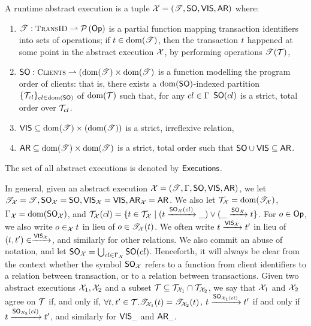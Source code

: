 \begin{definition}
A runtime abstract execution is a tuple $\mathcal{X} = (\mathscr{T}, {\sf{SO}}, {\mathsf{VIS}}, {\sf{AR}})$ where: 
\begin{enumerate}
\item $\TtoOp{T} : \TransID \rightharpoonup \powerset{\Op}$ is a partial function mapping transaction 
identifiers into sets of operations; if $t \in \operatorname{dom}(\mathscr{T})$, then the transaction $t$ happened 
at some point in the abstract execution ${\mathcal{X}}$, by performing operations $\mathscr{T}(\mathcal{T})$, 
\item $\PO: \tidset \rightharpoonup (\dom(\TtoOp{T}) \times \dom(\TtoOp{T})$ is a function modelling the 
program order of clients: that is, there exists a $\operatorname{dom}({\sf{SO}})$-indexed partition $\{\mathcal{T}_{cl}\}_{cl \in \operatorname{dom}({\sf{SO}})}$ of 
$\operatorname{dom}(\mathscr{\mathcal{T}})$ such that, for any $cl \in \Gamma$ ${\sf{SO}}(cl)$ is a strict, total order over $\mathcal{T}_{cl}$.
\item ${\mathsf{VIS}} \subseteq \operatorname{dom}(\mathscr{T}) \times (\operatorname{dom}(\mathscr{T}))$ is a strict, irreflexive relation, 
\item ${\sf{AR}} \subseteq \operatorname{dom}(\mathscr{T}) \times \operatorname{dom}(\mathscr{T})$ is a strict, total order such that ${\sf{SO}} \cup {\mathsf{VIS}} \subseteq {\sf{AR}}$.
\end{enumerate}

The set of all abstract executions is denoted by ${\mathsf{Executions}}$.
\end{definition}
In general, given an abstract execution ${\mathcal{X}} = (\mathscr{T}, \Gamma, {\sf{SO}}, {\mathsf{VIS}}, {\sf{AR}})$, we let ${\mathscr{T}}_{\mathcal{X}} = \mathscr{T}, 
 {\sf{SO}}_{\mathcal{X}} = {\sf{SO}}, {{\mathsf{VIS}}}_{\mathcal{X}} = {\mathsf{VIS}}, {\sf{AR}}_{\mathcal{X}} = {\sf{AR}}$. We also let $\mathcal{T}_{\mathcal{X}} = \operatorname{dom}(\mathscr{T}_{\mathcal{X}})$, 
 $\Gamma_{\mathcal{X}} = \operatorname{dom}({\sf{SO}}_{\mathcal{X}})$, and $\mathcal{T}_{\mathcal{X}}(cl) = \{t \in \mathcal{T}_{\mathcal{X}} \mid (t \xrightarrow{{\sf{SO}}_{\mathcal{X}}(cl)} \_) 
 \vee (\_ \xrightarrow{{\sf{SO}}_{\mathcal{X}}} t \}$. For $o \in \mathsf{Op}$, we also write $o \in_{{\mathcal{X}}} t$ in lieu of $o \in \mathscr{T}_{\mathcal{X}}(t)$.
We often write $t \xrightarrow{{\mathsf{VIS}}_{{\mathcal{X}}}} t'$ in lieu of $(t, t') \in \xrightarrow{{\mathsf{VIS}}_{{\mathcal{X}}}}$, 
and similarly for other relations. We also commit an abuse of notation, and let ${\sf{SO}}_{{\mathcal{X}}} = 
\bigcup_{cl \in \Gamma_{\mathcal{X}}} {\sf{SO}}(cl)$. Henceforth, it will always be clear from the context 
whether the symbol ${\sf{SO}}_{\mathcal{X}}$ refers to a function from client identifiers to a relation between transaction, or to a relation
between transactions. 
Given two abstract executions $\mathcal{X}_1, \mathcal{X}_2$ and a subset $\mathcal{T} \subseteq \mathcal{T}_{\mathcal{X}_1} \cap \mathcal{T}_{\mathcal{X}_2}$, 
we say that $\mathcal{X}_1$ and $\mathcal{X}_2$ agree on $\mathcal{T}$ if, and only if, $\forall t,t' \in \mathcal{T}. \mathscr{T}_{\mathcal{X}_1}(t) = 
\mathscr{T}_{\mathcal{X}_2}(t)$, $t \xrightarrow{{\sf{SO}}_{\mathcal{X}_1(cl)}} t'$ if and only if $t \xrightarrow{{\sf{SO}}_{\mathcal{X}_2}(cl)} 
t'$, and similarly for ${\mathsf{VIS}}_{\_}$ and ${\sf{AR}}_{\_}$.

